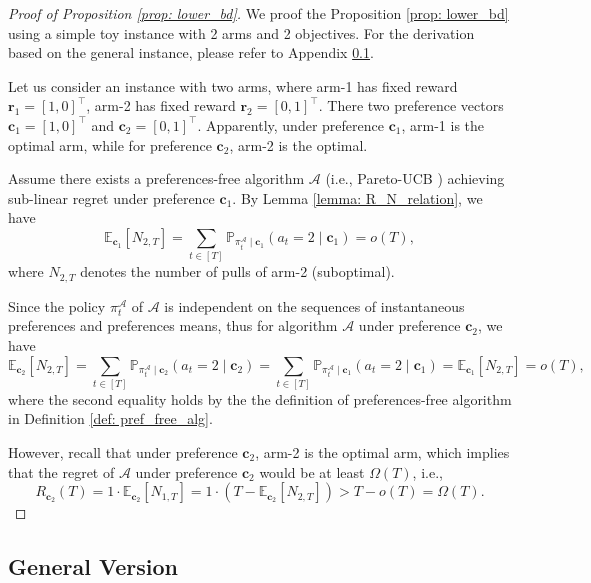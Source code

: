 \begin{proof}[Proof of Proposition \ref{prop: lower_bd}]  
We proof the Proposition \ref{prop: lower_bd} using a simple toy instance with 2 arms and 2 objectives. For the derivation based on the general instance, please refer to Appendix \ref{sce: app_pf_lower_bd_general}.

Let us consider an instance with two arms, where arm-1 has fixed reward $\boldsymbol{r}_{1} = [1,0]^{\top}$, arm-2 has fixed reward $\boldsymbol{r}_{2} = [0,1]^{\top}$. There two preference vectors $\boldsymbol{c}_1 = [1,0]^{\top}$ and $\boldsymbol{c}_2 = [0,1]^{\top}$.
Apparently, under preference $\boldsymbol{c}_1$, arm-1 is the optimal arm, while for preference $\boldsymbol{c}_2$, arm-2 is the optimal.

Assume there exists a preferences-free algorithm $\mathcal{A}$ (i.e., Pareto-UCB \cite{drugan2013designing}) achieving sub-linear regret under preference $\boldsymbol{c}_1$.
By Lemma \ref{lemma: R_N_relation}, we have 
\[
\mathbb{E}_{\boldsymbol{c}_1}[N_{2,T}] = \sum_{t \in [T]} \mathbb{P}_{\pi^{\mathcal{A}}_t \mid \boldsymbol{c}_1} (a_t = 2 \mid \boldsymbol{c}_1) = o(T),
\]
where $N_{2,T}$ denotes the number of pulls of arm-2 (suboptimal).


Since the policy $\pi^{\mathcal{A}}_t$ of $\mathcal{A}$ is  independent on the sequences of instantaneous preferences and preferences means, thus for algorithm $\mathcal{A}$ under preference $\boldsymbol{c}_2$, we have 
\[
\mathbb{E}_{\boldsymbol{c}_2}[N_{2,T}] = \sum_{t \in [T]} \mathbb{P}_{\pi^{\mathcal{A}}_t \mid \boldsymbol{c}_2} (a_t = 2 \mid \boldsymbol{c}_2) 
= \sum_{t \in [T]} \mathbb{P}_{\pi^{\mathcal{A}}_t \mid \boldsymbol{c}_1 } (a_t = 2 \mid \boldsymbol{c}_1)
= \mathbb{E}_{\boldsymbol{c}_1}[N_{2,T}] = o(T),
\]
where the second equality holds by the the definition of preferences-free algorithm in Definition \ref{def: pref_free_alg}.

However, recall that under preference $\boldsymbol{c}_2$, arm-2 is the optimal arm, which implies that the regret of $\mathcal{A}$ under preference $\boldsymbol{c}_2$ would be at least $\Omega(T)$, i.e.,
\[
R_{\boldsymbol{c}_2}(T) 
= 
1 \cdot \mathbb{E}_{\boldsymbol{c}_2}[N_{1,T}]
=
1 \cdot (T - \mathbb{E}_{\boldsymbol{c}_2}[N_{2,T}])
>
T - o(T)
=
\Omega(T).
\]
\end{proof}

\subsection{General Version}
\label{sce: app_pf_lower_bd_general}

